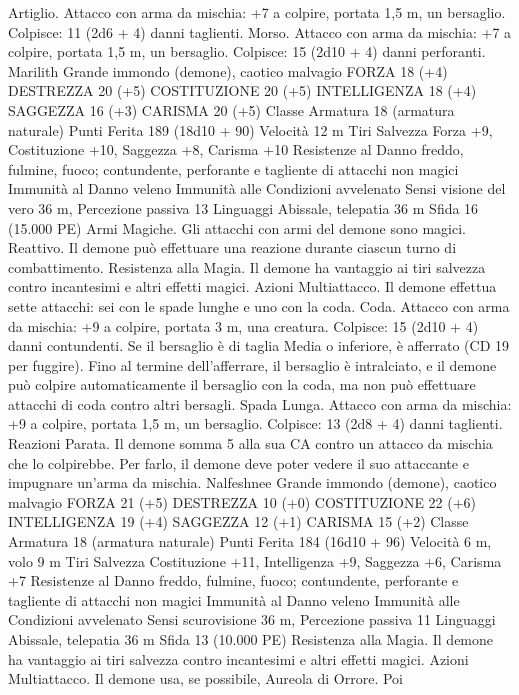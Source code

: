 \begin{multicols}{2}
Artiglio. Attacco con arma da mischia: +7 a colpire, portata 1,5
m, un bersaglio.
Colpisce: 11 (2d6 + 4) danni taglienti.
Morso. Attacco con arma da mischia: +7 a colpire, portata 1,5
m, un bersaglio.
Colpisce: 15 (2d10 + 4) danni perforanti. 
Marilith
Grande immondo (demone), caotico malvagio
FORZA 18 (+4)
DESTREZZA 20 (+5)
COSTITUZIONE 20 (+5)
INTELLIGENZA 18 (+4)
SAGGEZZA 16 (+3)
CARISMA 20 (+5)
Classe Armatura 18 (armatura naturale)
Punti Ferita 189 (18d10 + 90)
Velocità 12 m
Tiri Salvezza Forza +9, Costituzione +10, Saggezza +8, Carisma
+10
Resistenze al Danno freddo, fulmine, fuoco; contundente,
perforante e tagliente di attacchi non magici
Immunità al Danno veleno
Immunità alle Condizioni avvelenato
Sensi visione del vero 36 m, Percezione passiva 13
Linguaggi Abissale, telepatia 36 m
Sfida 16 (15.000 PE)
Armi Magiche. Gli attacchi con armi del demone sono magici.
Reattivo. Il demone può effettuare una reazione durante ciascun
turno di combattimento.
Resistenza alla Magia. Il demone ha vantaggio ai tiri salvezza
contro incantesimi e altri effetti magici.
Azioni
Multiattacco. Il demone effettua sette attacchi: sei con le spade
lunghe e uno con la coda.
Coda. Attacco con arma da mischia: +9 a colpire, portata 3 m,
una creatura.
Colpisce: 15 (2d10 + 4) danni contundenti. Se il bersaglio è di
taglia Media o inferiore, è afferrato (CD 19 per fuggire). Fino al
termine dell’afferrare, il bersaglio è intralciato, e il demone può
colpire automaticamente il bersaglio con la coda, ma non può
effettuare attacchi di coda contro altri bersagli.
Spada Lunga. Attacco con arma da mischia: +9 a colpire,
portata 1,5 m, un bersaglio.
Colpisce: 13 (2d8 + 4) danni taglienti.
Reazioni
Parata. Il demone somma 5 alla sua CA contro un attacco da
mischia che lo colpirebbe. Per farlo, il demone deve poter vedere
il suo attaccante e impugnare un’arma da mischia.
Nalfeshnee
Grande immondo (demone), caotico malvagio
FORZA 21 (+5)
DESTREZZA 10 (+0)
COSTITUZIONE 22 (+6)
INTELLIGENZA 19 (+4)
SAGGEZZA 12 (+1)
CARISMA 15 (+2)
Classe Armatura 18 (armatura naturale)
Punti Ferita 184 (16d10 + 96)
Velocità 6 m, volo 9 m
Tiri Salvezza Costituzione +11, Intelligenza +9, Saggezza +6,
Carisma +7
Resistenze al Danno freddo, fulmine, fuoco; contundente,
perforante e tagliente di attacchi non magici
Immunità al Danno veleno
Immunità alle Condizioni avvelenato
Sensi scurovisione 36 m, Percezione passiva 11
Linguaggi Abissale, telepatia 36 m
Sfida 13 (10.000 PE)
Resistenza alla Magia. Il demone ha vantaggio ai tiri salvezza
contro incantesimi e altri effetti magici.
Azioni
Multiattacco. Il demone usa, se possibile, Aureola di Orrore. Poi

\end{multicols}
